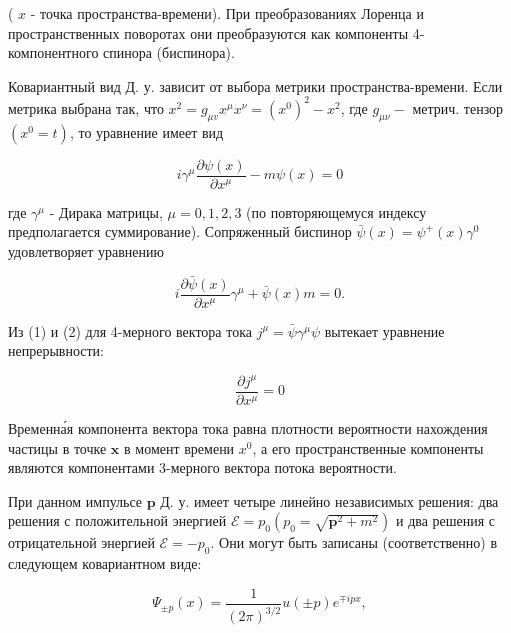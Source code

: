\documentclass[10pt]{article}
\begin{document}
( $x$ - точка пространства-времени). При преобразованиях Лоренца и пространственных поворотах они преобразуются как компоненты 4-компонентного спинора (биспинора).



Ковариантный вид Д. у. зависит от выбора метрики пространства-времени. Если метрика выбрана так, что $x^{2}=g_{\mu v} x^{\mu} x^{\nu}=\left(x^{0}\right)^{2}-x^{2}$, где $g_{\mu \nu}-$ метрич. тензор $\left(x^{0}=t\right)$, то уравнение имеет вид



\[

i \gamma^{\mu} \frac{\partial \psi(x)}{\partial x^{\mu}}-m \psi(x)=0

\]



где $\gamma^{\mu}$ - Дирака матрицы, $\mu=0,1,2,3$ (по повторяющемуся индексу предполагается суммирование). Сопряженный биспинор $\bar{\psi}(x)=\psi^{+}(x) \gamma^{0}$ удовлетворяет уравнению



\[

i \frac{\partial \bar{\psi}(x)}{\partial x^{\mu}} \gamma^{\mu}+\bar{\psi}(x) m=0 .

\]



Из (1) и (2) для 4-мерного вектора тока $j^{\mu}=\bar{\psi} \gamma^{\mu} \psi$ вытекает уравнение непрерывности:



\[

\frac{\partial j^{\mu}}{\partial x^{\mu}}=0

\]



Временна́я компонента вектора тока равна плотности вероятности нахождения частицы в точке $\boldsymbol{x}$ в момент времени $x^{0}$, а его пространственные компоненты являются компонентами 3-мерного вектора потока вероятности.



При данном импульсе $\boldsymbol{p}$ Д. у. имеет четыре линейно независимых решения: два решения с положительной энергией $\mathscr{E}=p_{0}\left(p_{0}=\sqrt{\boldsymbol{p}^{2}+m^{2}}\right)$ и два решения с отрицательной энергией $\mathscr{E}=-p_{0}$. Они могут быть записаны (соответственно) в следующем ковариантном виде:



\[

\Psi_{ \pm p}(x)=\frac{1}{(2 \pi)^{3 / 2}} u( \pm p) e^{\mp i p x},

\]
\end{document}
